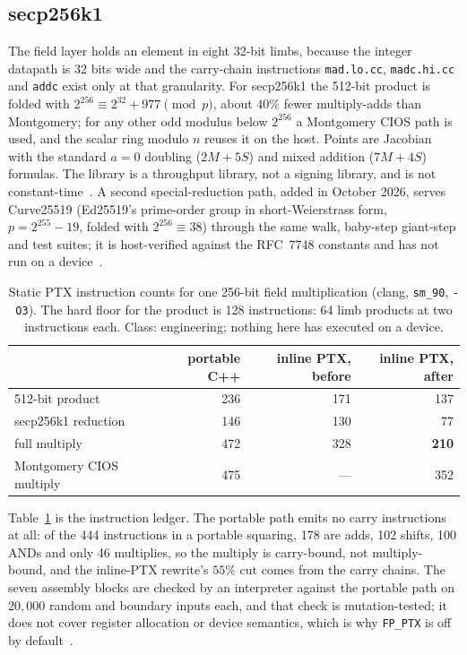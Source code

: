 \subsection{secp256k1}
\label{sec:othergpu-fp256}

The field layer holds an element in eight 32-bit limbs, because the
integer datapath is 32 bits wide and the carry-chain instructions
\texttt{mad.lo.cc}, \texttt{madc.hi.cc} and \texttt{addc} exist only at
that granularity. For secp256k1 the 512-bit product is folded with
$2^{256}\equiv2^{32}+977 \pmod p$, about $40\%$ fewer multiply-adds
than Montgomery; for any other odd modulus below $2^{256}$ a
Montgomery CIOS path is used, and the scalar ring modulo $n$ reuses
it on the host. Points are Jacobian with the standard $a=0$ doubling
($2M+5S$) and mixed addition ($7M+4S$) formulas. The library is a
throughput library, not a signing library, and is not
constant-time~.
A second special-reduction path, added in October 2026, serves
Curve25519 (Ed25519's prime-order group in short-Weierstrass form,
$p=2^{255}-19$, folded with $2^{256}\equiv38$) through the same
walk, baby-step giant-step and test suites; it is host-verified
against the RFC~7748 constants and has not run on a
device~.

\begin{table}[t]
\centering
\small
\caption{Static PTX instruction counts for one 256-bit field
  multiplication (clang, \texttt{sm\_90}, \texttt{-O3}). The hard floor
  for the product is 128 instructions: 64 limb products at two
  instructions each. Class: engineering; nothing here has executed on
  a device.}
\label{tab:fp256}
\begin{tabular}{@{}lrrr@{}}
\toprule
 & portable C++ & inline PTX, before & inline PTX, after \\
\midrule
512-bit product & 236 & 171 & 137 \\
secp256k1 reduction & 146 & 130 & 77 \\
full multiply & 472 & 328 & \textbf{210} \\
\midrule
Montgomery CIOS multiply & 475 & --- & 352 \\
\bottomrule
\end{tabular}
\end{table}

Table~\ref{tab:fp256} is the instruction ledger. The portable path
emits no carry instructions at all: of the 444 instructions in a
portable squaring, 178 are adds, 102 shifts, 100 ANDs and only 46
multiplies, so the multiply is carry-bound, not multiply-bound, and
the inline-PTX rewrite's $55\%$ cut comes from the carry chains. The
seven assembly blocks are checked by an interpreter against the
portable path on $20{,}000$ random and boundary inputs each, and that
check is mutation-tested; it does not cover register allocation or
device semantics, which is why \texttt{FP\_PTX} is off by
default~.

